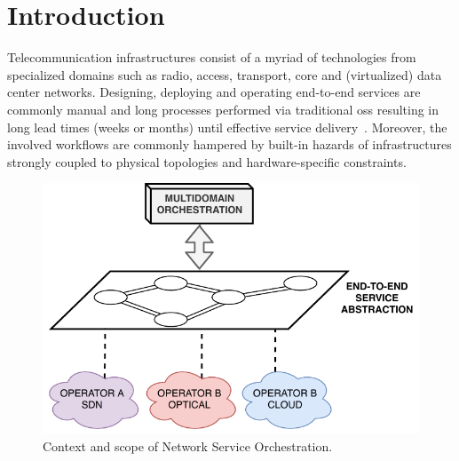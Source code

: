 \section{Introduction}

Telecommunication  infrastructures consist of a myriad of technologies from specialized domains such as radio,  access, transport, core and (virtualized) data center networks. Designing, deploying and operating end-to-end services are commonly   manual and long processes performed via traditional \gls{oss} resulting in long lead times (weeks or months) until effective service delivery~\cite{BluePlanet2017ProductsOrchestration}. Moreover, the involved workflows are commonly hampered by built-in hazards of infrastructures strongly coupled to physical topologies and hardware-specific constraints.

\begin{figure}[t!]
  \centering
  \includegraphics[scale=.76]{Figures/01_Introduction/fig1.pdf}
    \caption{Context and scope of Network Service Orchestration.}
    \label{intro}
\end{figure}


